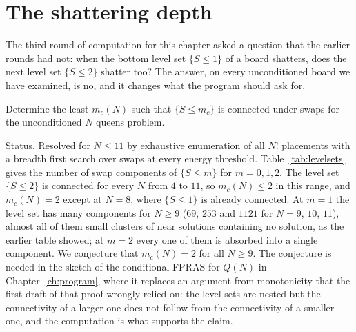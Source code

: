 \section{The shattering depth}
\label{sec:depth}

The third round of computation for this chapter asked a question that the earlier rounds had not: when the bottom level set $\{ S \le 1 \}$ of a board shatters, does the next level set $\{ S \le 2 \}$ shatter too? The answer, on every unconditioned board we have examined, is no, and it changes what the program should ask for.

\begin{problem}
Determine the least $m_c(N)$ such that $\{ S \le m_c \}$ is connected under swaps for the unconditioned $N$ queens problem.
\end{problem}

Status. Resolved for $N \le 11$ by exhaustive enumeration of all $N!$ placements with a breadth first search over swaps at every energy threshold. Table~\ref{tab:levelsets} gives the number of swap components of $\{ S \le m \}$ for $m = 0, 1, 2$. The level set $\{ S \le 2 \}$ is connected for every $N$ from $4$ to $11$, so $m_c(N) \le 2$ in this range, and $m_c(N) = 2$ except at $N = 8$, where $\{ S \le 1 \}$ is already connected. At $m = 1$ the level set has many components for $N \ge 9$ ($69$, $253$ and $1121$ for $N = 9$, $10$, $11$), almost all of them small clusters of near solutions containing no solution, as the earlier table showed; at $m = 2$ every one of them is absorbed into a single component. We conjecture that $m_c(N) = 2$ for all $N \ge 9$. The conjecture is needed in the sketch of the conditional FPRAS for $Q(N)$ in Chapter~\ref{ch:program}, where it replaces an argument from monotonicity that the first draft of that proof wrongly relied on: the level sets are nested but the connectivity of a larger one does not follow from the connectivity of a smaller one, and the computation is what supports the claim.

